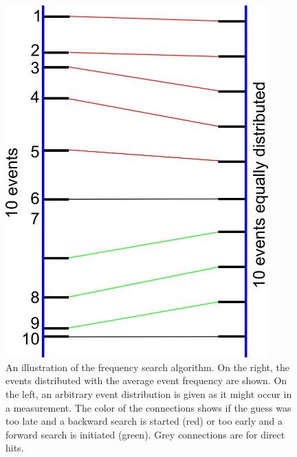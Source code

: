       \begin{figure}
	\begin{minipage}{0.49\textwidth}
		\centering
      	\includegraphics[width = 0.9\textwidth]{graphics/search/frequencySearch.png}
      	\caption[Frequency search Algorithm]{An illustration of the frequency search algorithm. On the right, the events distributed with the average event frequency are shown. On the left, an arbitrary event distribution is given as it might occur in a measurement. The color of the connections shows if the guess was too late and a backward search is started (red) or too early and a forward search is initiated (green). Grey connections are for direct hits.}
      	\label{fig:freqSearch}
	\end{minipage}
	\hfill
	\begin{minipage}{0.49\textwidth}
		\hspace{0.25 cm}

\end{minipage}
\end{figure}
